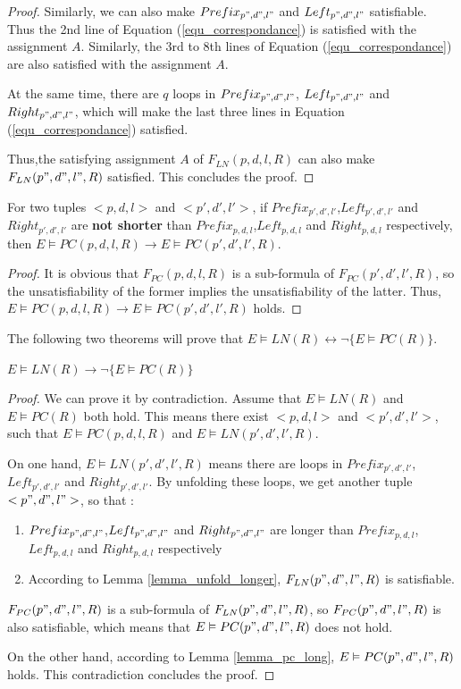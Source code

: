 \documentclass[journal]{IEEEtran}
\begin{document}
\begin{proof}
Similarly,
we can also make $Prefix_{p",d",l"}$ and $Left_{p",d",l"}$ satisfiable.
Thus the 2nd line of Equation (\ref{equ_correspondance}) is satisfied with the assignment $A$.
Similarly,
the 3rd to 8th lines of Equation (\ref{equ_correspondance}) are also satisfied with the assignment $A$.

At the same time,
there are $q$ loops in $Prefix_{p",d",l"}$, $Left_{p",d",l"}$ and $Right_{p",d",l"}$,
which will make the last three lines in Equation (\ref{equ_correspondance}) satisfied.

Thus,the satisfying assignment $A$ of $F_{LN}(p,d,l,R)$ can also make $F_{LN}(p",d",l",R)$ satisfied.
This concludes the proof.
\end{proof}

\begin{lemma}[]\label{lemma_pc_long}
For two tuples $<p,d,l>$ and $<p',d',l'>$,
if $Prefix_{p',d',l'}$,$Left_{p',d',l'}$ and $Right_{p',d',l'}$ are \textbf{not shorter} than $Prefix_{p,d,l}$,$Left_{p,d,l}$ and $Right_{p,d,l}$ respectively,
then $E\vDash PC(p,d,l,R)\to E\vDash PC(p',d',l',R)$.
\end{lemma}
\begin{proof}
It is obvious that $F_{PC}(p,d,l,R)$ is a sub-formula of $F_{PC}(p',d',l',R)$,
so the unsatisfiability of the former implies the unsatisfiability of the latter.
Thus,
$E\vDash PC(p,d,l,R)\to E\vDash PC(p',d',l',R)$ holds.
\end{proof}

The following two theorems will prove that $E\vDash LN(R)\leftrightarrow \neg \{E\vDash PC(R)\}$.

\begin{theorem}\label{thm_pc_nln}
$E\vDash LN(R)\to \neg \{E\vDash PC(R)\}$
\end{theorem}
\begin{proof}
We can prove it by contradiction.
Assume that $E\vDash LN(R)$ and $E\vDash PC(R)$ both hold.
This means there exist $<p,d,l>$ and $<p',d',l'>$,
such that $E\vDash PC(p,d,l,R)$ and $E\vDash LN(p',d',l',R)$.

On one hand,
$E\vDash LN(p',d',l',R)$ means there are loops in $Prefix_{p',d',l'}$,$Left_{p',d',l'}$ and $Right_{p',d',l'}$.
By unfolding these loops,
we get another tuple $<p",d",l">$,
so that :
\begin{enumerate}
\item $Prefix_{p",d",l"}$,$Left_{p",d",l"}$ and $Right_{p",d",l"}$ are longer than $Prefix_{p,d,l}$,$Left_{p,d,l}$ and $Right_{p,d,l}$ respectively
\item According to Lemma \ref{lemma_unfold_longer},
$F_{LN}(p",d",l",R)$ is satisfiable.
\end{enumerate}

$F_{PC}(p",d",l",R)$ is a sub-formula of $F_{LN}(p",d",l",R)$,
so $F_{PC}(p",d",l",R)$ is also satisfiable,
which means that $E\vDash PC(p",d",l",R)$ does not hold.

On the other hand,
according to Lemma \ref{lemma_pc_long},
$E\vDash PC(p",d",l",R)$ holds.
This contradiction concludes the proof.
\end{proof}
\end{document}
